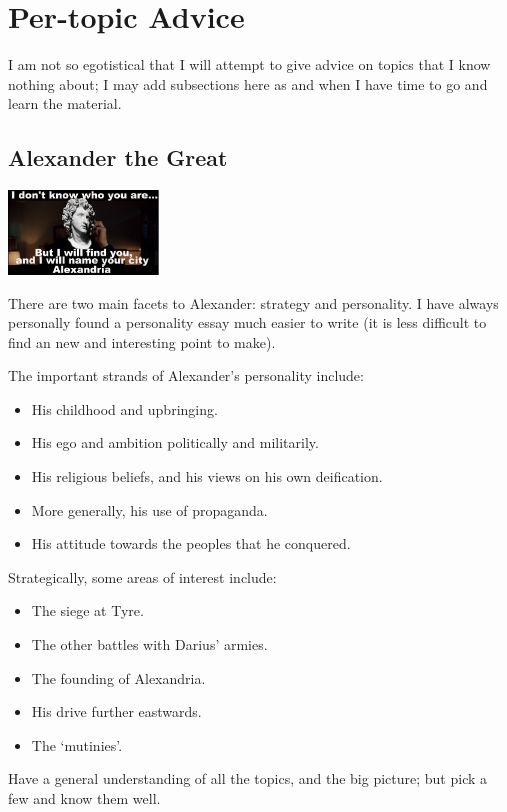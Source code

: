 \documentclass[a4paper,10pt]{article}
\begin{document}
\section{Per-topic Advice}
I am not so egotistical that I will attempt to give advice on topics that I know nothing about; I may add subsections here as and
when I have time to go and learn the material.

\subsection{Alexander the Great}
\begin{center}
  \includegraphics[width=0.3\textwidth]{alexander}
\end{center}
There are two main facets to Alexander: strategy and personality. I have always personally found a personality essay much
easier to write (it is less difficult to find an new and interesting point to make).

The important strands of Alexander's personality include:
\begin{itemize}
  \item His childhood and upbringing.
  \item His ego and ambition politically and militarily.
  \item His religious beliefs, and his views on his own deification.
  \item More generally, his use of propaganda.
  \item His attitude towards the peoples that he conquered.
\end{itemize}

Strategically, some areas of interest include:
\begin{itemize}
  \item The siege at Tyre.
  \item The other battles with Darius' armies.
  \item The founding of Alexandria.
  \item His drive further eastwards.
  \item The `mutinies'.
\end{itemize}

Have a general understanding of all the topics, and the big picture; but pick a few and know them well.
\end{document}
